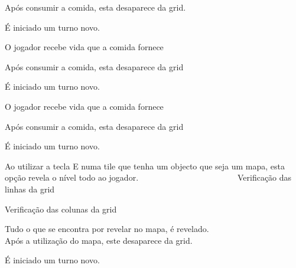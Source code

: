 Após consumir a comida, esta desaparece da grid.

É iniciado um turno novo.

O jogador recebe vida que a comida fornece

Após consumir a comida, esta desaparece da grid

É iniciado um turno novo.

O jogador recebe vida que a comida fornece

Após consumir a comida, esta desaparece da grid

É iniciado um turno novo.

Ao utilizar a tecla E numa tile que tenha um objecto que seja um mapa, esta opção revela o nível todo ao jogador. ~\newline
~\newline
~\newline
~\newline
~\newline
~\newline
~\newline
~\newline
~\newline
~\newline
~\newline
~\newline
~\newline
~\newline
 Verificação das linhas da grid

Verificação das colunas da grid

Tudo o que se encontra por revelar no mapa, é revelado. ~\newline
~\newline
~\newline
~\newline
~\newline
~\newline
~\newline
~\newline
~\newline
~\newline
~\newline
 Após a utilização do mapa, este desaparece da grid.

É iniciado um turno novo.


